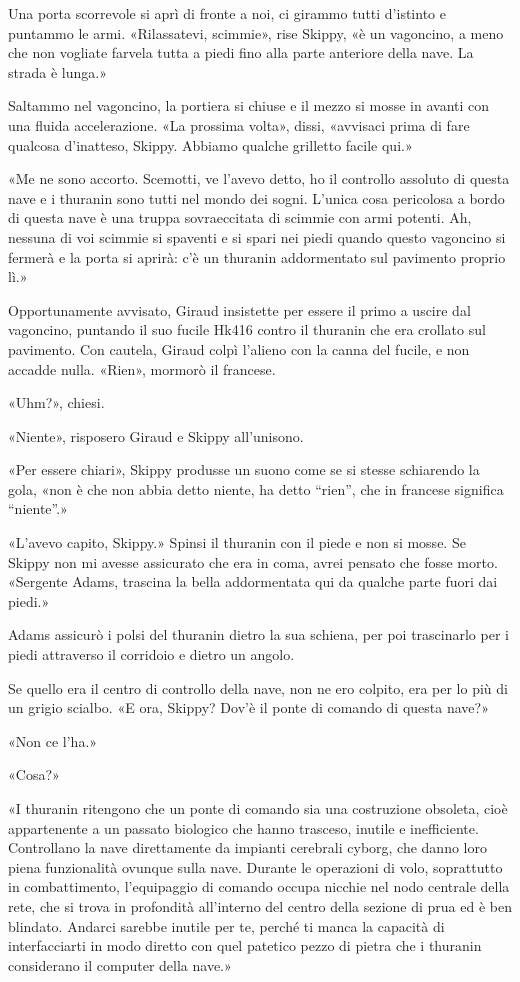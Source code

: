 Una porta scorrevole si aprì di fronte a noi, ci girammo tutti d'istinto
e puntammo le armi. «Rilassatevi, scimmie», rise Skippy, «è un
vagoncino, a meno che non vogliate farvela tutta a piedi fino alla parte
anteriore della nave. La strada è lunga.»

Saltammo nel vagoncino, la portiera si chiuse e il mezzo si mosse in
avanti con una fluida accelerazione. «La prossima volta», dissi,
«avvisaci prima di fare qualcosa d'inatteso, Skippy. Abbiamo qualche
grilletto facile qui.»

«Me ne sono accorto. Scemotti, ve l'avevo detto, ho il controllo
assoluto di questa nave e i thuranin sono tutti nel mondo dei sogni.
L'unica cosa pericolosa a bordo di questa nave è una truppa
sovraeccitata di scimmie con armi potenti. Ah, nessuna di voi scimmie si
spaventi e si spari nei piedi quando questo vagoncino si fermerà e la
porta si aprirà: c'è un thuranin addormentato sul pavimento proprio lì.»

Opportunamente avvisato, Giraud insistette per essere il primo a uscire
dal vagoncino, puntando il suo fucile Hk416 contro il thuranin che era
crollato sul pavimento. Con cautela, Giraud colpì l'alieno con la canna
del fucile, e non accadde nulla. «Rien», mormorò il francese.

«Uhm?», chiesi.

«Niente», risposero Giraud e Skippy all'unisono.

«Per essere chiari», Skippy produsse un suono come se si stesse
schiarendo la gola, «non è che non abbia detto niente, ha detto
``rien'', che in francese significa ``niente''.»

«L'avevo capito, Skippy.» Spinsi il thuranin con il piede e non si
mosse. Se Skippy non mi avesse assicurato che era in coma, avrei pensato
che fosse morto. «Sergente Adams, trascina la bella addormentata qui da
qualche parte fuori dai piedi.»

Adams assicurò i polsi del thuranin dietro la sua schiena, per poi
trascinarlo per i piedi attraverso il corridoio e dietro un angolo.

Se quello era il centro di controllo della nave, non ne ero colpito, era
per lo più di un grigio scialbo. «E ora, Skippy? Dov'è il ponte di
comando di questa nave?»

«Non ce l'ha.»

«Cosa?»

«I thuranin ritengono che un ponte di comando sia una costruzione
obsoleta, cioè appartenente a un passato biologico che hanno trasceso,
inutile e inefficiente. Controllano la nave direttamente da impianti
cerebrali cyborg, che danno loro piena funzionalità ovunque sulla nave.
Durante le operazioni di volo, soprattutto in combattimento,
l'equipaggio di comando occupa nicchie nel nodo centrale della rete, che
si trova in profondità all'interno del centro della sezione di prua ed è
ben blindato. Andarci sarebbe inutile per te, perché ti manca la
capacità di interfacciarti in modo diretto con quel patetico pezzo di
pietra che i thuranin considerano il computer della nave.»

